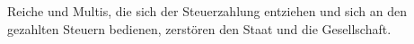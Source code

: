 Reiche und Multis, die sich der Steuerzahlung entziehen und sich an den gezahlten Steuern bedienen, zerstören den Staat und die Gesellschaft.